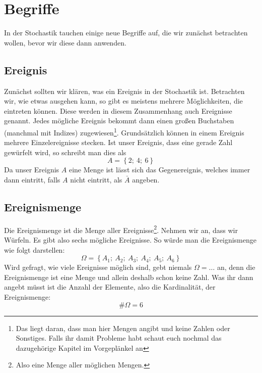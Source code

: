 \section{Begriffe}
	In der Stochastik tauchen einige neue Begriffe auf, die wir zunächst betrachten
	wollen, bevor wir diese dann anwenden.

	\subsection{Ereignis}
		Zunächst sollten wir klären, was ein Ereignis in der Stochastik ist.
		Betrachten wir, wie etwas ausgehen kann, so gibt es meistens mehrere
		Möglichkeiten, die eintreten können. Diese werden in diesem Zusammenhang auch
		Ereignisse genannt. Jedes mögliche Ereignis bekommt dann einen großen
		Buchstaben (manchmal mit Indizes) zugewiesen\footnote{Das liegt daran, dass
		man hier Mengen angibt und keine Zahlen oder Sonstiges. Falls ihr damit
		Probleme habt schaut euch nochmal das dazugehörige Kapitel im Vorgeplänkel
		an}. Grundsätzlich können in einem Ereignis mehrere Einzelereignisse stecken.
		Ist unser Ereignis, dass eine gerade Zahl gewürfelt wird, so schreibt man dies
		als
		\[A=\left\lbrace 2;\ 4;\ 6\right\rbrace \]
		Da unser Ereignis \(A\) eine Menge ist lässt sich das Gegenereignis, welches
		immer dann eintritt, falls \(A\) nicht eintritt, als \(\bar{A}\) angeben.

	\subsection{Ereignismenge}
		Die Ereignismenge ist die Menge aller Ereignisse\footnote{Also eine Menge
		aller möglichen Mengen.}. Nehmen wir an, dass wir Würfeln. Es gibt also sechs
		mögliche Ereignisse. So würde man die Ereignismenge wie folgt darstellen:
		\[\Omega=\left\lbrace A_1;\ A_2;\ A_3;\ A_4;\ A_5;\ A_6\right\rbrace \]
		Wird gefragt, wie viele Ereignisse möglich sind, gebt niemals
		\(\Omega=\ldots\) an, denn die Ereignismenge ist eine Menge und allein deshalb
		schon keine Zahl. Was ihr dann angebt müsst ist die Anzahl der Elemente, also
		die Kardinalität, der Ereignismenge:
		\[\#\Omega=6\]

